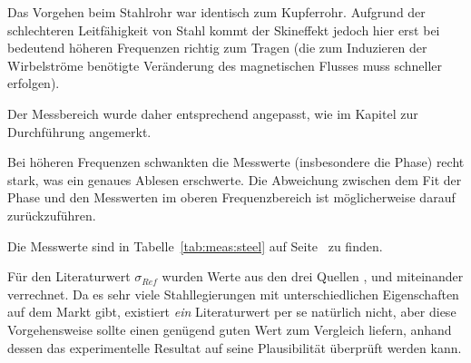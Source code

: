 {\begin{minipage}[t]{0.33\textwidth}
        Das Vorgehen beim Stahlrohr war identisch zum Kupferrohr. Aufgrund der
        schlechteren  Leitf\"ahigkeit von  Stahl kommt  der Skineffekt  jedoch
        hier  erst  bei  bedeutend  h\"oheren Frequenzen  richtig  zum  Tragen
        (die zum  Induzieren der Wirbelstr\"ome ben\"otigte  Ver\"anderung des
        magnetischen Flusses muss schneller erfolgen).

        Der Messbereich wurde daher entsprechend angepasst, wie im Kapitel zur
        Durchf\"uhrung angemerkt.

        Bei  h\"oheren  Frequenzen   schwankten  die  Messwerte  (insbesondere
        die  Phase)  recht  stark,  was ein  genaues  Ablesen  erschwerte. Die
        Abweichung zwischen  dem Fit  der Phase und  den Messwerten  im oberen
        Frequenzbereich ist m\"oglicherweise darauf zur\"uckzuf\"uhren.

        Die    Messwerte    sind     in    Tabelle~\ref{tab:meas:steel}    auf
        Seite~\pageref{tab:meas:steel} zu finden.

        F\"ur     den     Literaturwert    $\sigma_{Ref}$     wurden     Werte
        aus     den    drei    Quellen     \cite{ref:stainless:hypertextbook},
        \cite{ref:stainless:aksteel} und       \cite{ref:stainless:stahlwerke}
        miteinander   verrechnet. Da  es   sehr  viele   Stahllegierungen  mit
        unterschiedlichen   Eigenschaften  auf   dem  Markt   gibt,  existiert
        \emph{ein}  Literaturwert   per  se  nat\"urlich  nicht,   aber  diese
        Vorgehensweise  sollte  einen  gen\"ugend  guten  Wert  zum  Vergleich
        liefern,  anhand   dessen  das  experimentelle  Resultat   auf  seine
        Plausibilit\"at \"uberpr\"uft werden kann.



\end{minipage}}
